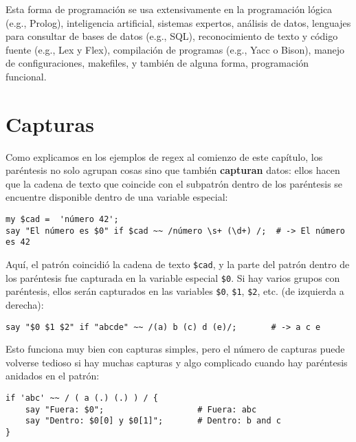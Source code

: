 
Esta forma de programación se usa extensivamente en la
programación lógica (e.g., Prolog), inteligencia artificial,
sistemas expertos, análisis de datos, lenguajes para
consultar de bases de datos (e.g., SQL), reconocimiento de
texto y código fuente (e.g., Lex y Flex), compilación de
programas (e.g., Yacc o Bison), manejo de configuraciones, 
makefiles, y también de alguna forma, programación funcional.


\section{Capturas}

Como explicamos en los ejemplos de regex al comienzo de este 
capítulo, los paréntesis no solo agrupan cosas sino que también
{\bf capturan} datos: ellos hacen que la cadena de texto que 
coincide con el subpatrón dentro de los paréntesis se 
encuentre disponible dentro de una variable especial:

\begin{verbatim}
my $cad =  'número 42';
say "El número es $0" if $cad ~~ /número \s+ (\d+) /;  # -> El número es 42
\end{verbatim}
%

Aquí, el patrón coincidió la cadena de texto \verb|$cad|,
y la parte del patrón dentro de los paréntesis fue capturada
en la variable especial \verb|$0|. Si hay varios grupos 
con paréntesis, ellos serán capturados en las variables
\verb|$0|, \verb|$1|, \verb|$2|, etc. (de izquierda a derecha):

\begin{verbatim}
say "$0 $1 $2" if "abcde" ~~ /(a) b (c) d (e)/;       # -> a c e
\end{verbatim}
%

Esto funciona muy bien con capturas simples, pero el 
número de capturas puede volverse tedioso si hay 
muchas capturas y algo complicado cuando hay paréntesis
anidados en el patrón:

\begin{verbatim}
if 'abc' ~~ / ( a (.) (.) ) / {
    say "Fuera: $0";                   # Fuera: abc
    say "Dentro: $0[0] y $0[1]";       # Dentro: b and c
}
\end{verbatim}

